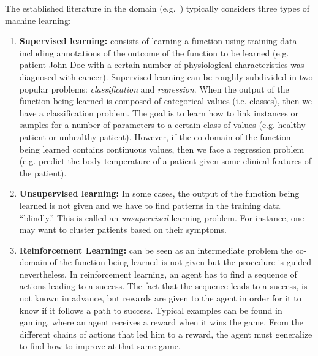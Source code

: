 The established literature in the domain (e.g.~\cite{mitchell:1997}) typically
considers three types of machine learning:
\begin{enumerate}
\item \textbf{Supervised learning:} consists of learning a function using
training data including annotations of the outcome of the function to be learned
(e.g. patient John Doe with a certain number of physiological characteristics
was diagnosed with cancer). Supervised learning can be roughly subdivided in two
popular problems:
\emph{classification} and \emph{regression}. When the output of the function
being learned is composed of categorical values (i.e. classes), then we have a
classification problem. The goal is to learn how to link instances or samples
for a number of parameters to a certain class of values (e.g. healthy patient or
unhealthy patient). However, if the co-domain of the function being learned
contains continuous values, then we face a regression problem (e.g. predict the 
body temperature of a patient given some clinical features of the patient).

\item \textbf{Unsupervised learning:} In some cases, the output of the
function being learned is not given and we have to find patterns in the training data ``blindly.'' This is called an
\emph{unsupervised} learning problem. For instance, one may want to cluster
patients based on their symptoms.
 
\item \textbf{Reinforcement Learning:} can be seen as an intermediate
problem the co-domain of the function being learned is not given but the procedure is guided
nevertheless. In reinforcement learning, an agent has to find a sequence of
actions leading to a success. The fact that the sequence leads to a success, is
not known in advance, but rewards are given to the agent in order for it to know
if it follows a path to success. Typical examples can be found in gaming, where
an agent receives a reward when it wins the game. From the different chains of
actions that led him to a reward, the agent must generalize to find how to
improve at that same game.

\end{enumerate}